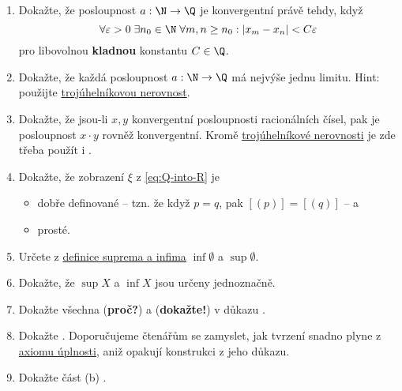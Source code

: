 \section*{}

\begin{enumerate}
 \item Dokažte, že posloupnost $a:\N \to \Q$ je konvergentní právě tehdy, když
  \[
   \forall \varepsilon>0 \; \exists n_0 \in \N \; \forall m,n \geq n_0: |x_m -
   x_n| < C\varepsilon
  \]
  pro libovolnou \textbf{kladnou} konstantu $C \in \Q$.
 \item Dokažte, že každá posloupnost $a:\N \to \Q$ má nejvýše jednu limitu.
  Hint: použijte \hyperref[lem:trojuhelnikova-nerovnost]{trojúhelníkovou
  nerovnost}.
 \item Dokažte, že jsou-li $x,y$ konvergentní posloupnosti racionálních čísel,
  pak je posloupnost $x \cdot y$ rovněž konvergentní. Kromě
  \hyperref[lem:trojuhelnikova-nerovnost]{trojúhelníkové nerovnosti} je zde
  třeba použít i .
 \item Dokažte, že zobrazení $\xi$ z \eqref{eq:Q-into-R} je
  \begin{itemize}
   \item dobře definované -- tzn. že když $p = q$, pak $[(p)] = [(q)]$ -- a
   \item prosté.
  \end{itemize}
 \item Určete z \hyperref[def:supremum-a-infimum]{definice suprema a infima}
  $\inf \emptyset$ a $\sup \emptyset$.
 \item Dokažte, že $\sup X$ a $\inf X$ jsou určeny jednoznačně.
 \item Dokažte všechna (\textbf{proč?}) a (\textbf{dokažte!}) v důkazu
  .
 \item Dokažte . Doporučujeme čtenářům se
  zamyslet, jak tvrzení snadno plyne z \hyperref[prop:axiom-uplnosti]{axiomu
  úplnosti}, aniž opakují konstrukci z jeho důkazu.
 \item Dokažte část (b) .
\end{enumerate}
